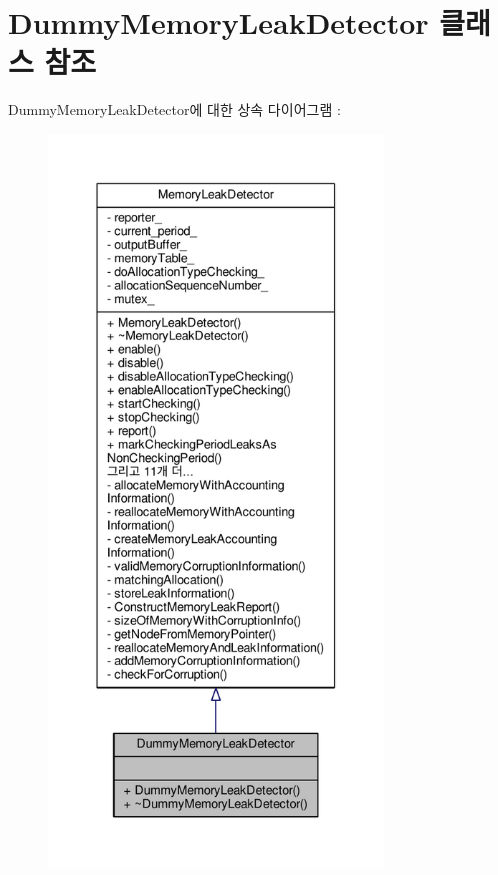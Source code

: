 \hypertarget{class_dummy_memory_leak_detector}{}\section{Dummy\+Memory\+Leak\+Detector 클래스 참조}
\label{class_dummy_memory_leak_detector}


Dummy\+Memory\+Leak\+Detector에 대한 상속 다이어그램 \+: 
\nopagebreak
\begin{figure}[H]
\begin{center}
\leavevmode
\includegraphics[height=550pt]{class_dummy_memory_leak_detector__inherit__graph}
\end{center}
\end{figure}


